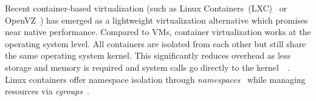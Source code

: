 %
%
%
%
%
%
%
%
%


Recent container-based virtualization (such as Linux Containers~(LXC)~\cite{LXC} or
OpenVZ~\cite{OpenVZ}) has emerged as a lightweight virtualization alternative
which promises near native performance.
%
Compared to VMs, container virtualization works at the
operating system level. %
%
All containers are isolated from each other but still share the same operating
system kernel. This significantly reduces overhead as less storage and memory is
required and system calls go directly to the kernel~\cite{ContainInResearch}~\cite{ContainerVirtualization}. 
%
Linux containers offer namespace isolation through
\textit{namespaces}~\cite{namespaces}
while managing resources via \textit{cgroups}~\cite{cgroups}.


%
%


